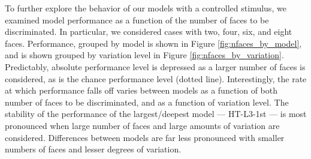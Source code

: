 To further explore the behavior of our models with a controlled stimulus, we examined model
performance as a function of the number of faces to be discriminated.  In particular, we
considered cases with two, four, six, and eight faces.  Performance, grouped by model is shown
in Figure \ref{fig:nfaces_by_model}, and is shown grouped by variation level in
Figure \ref{fig:nfaces_by_variation}.  Predictably, absolute performance level is depressed as a larger
number of faces is considered, as is the chance performance level (dotted line). Interestingly, the
rate at which performance falls off varies between models as a function of both number of faces
to be discriminated, and as a function of variation level.  The stability of the performance of the
largest/deepest model --- HT-L3-1st --- is most pronounced when large number of faces and large amounts of variation
are considered.  Differences between models are far less pronounced with smaller numbers of
faces and lesser degrees of variation.



